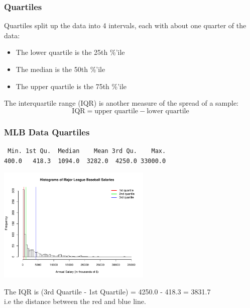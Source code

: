 \documentclass[handout]{beamer}
\newcommand{\blue}[1]{\textcolor{blue2}{#1}}
\begin{document}
\begin{frame}
\frametitle{Quartiles}
\blue{Quartiles} split up the data into 4 intervals, each with about one quarter of the data:

\vspace{0.25cm}

\begin{itemize}
\pause \item The lower quartile is the 25th \%'ile
\pause \item The median is the 50th \%'ile
\pause \item The upper quartile is the 75th \%'ile
\end{itemize}

\vspace{0.25cm}

\pause The \blue{interquartile range (IQR)} is another measure of the spread of a sample:
\[
\mbox{IQR} = \mbox{upper quartile} - \mbox{lower quartile}
\]

\end{frame}


\begin{frame}[fragile]
\frametitle{MLB Data Quartiles}

\begin{verbatim}
 Min. 1st Qu.  Median    Mean 3rd Qu.    Max.
400.0   418.3  1094.0  3282.0  4250.0 33000.0
\end{verbatim}

\begin{center}
\includegraphics[height=5.5cm]{figure/MLB_quartiles.pdf}
\end{center}

The IQR is (3rd Quartile - 1st Quartile) = 4250.0 - 418.3 = 3831.7\\
i.e the distance between the red and blue line.  

\end{frame}
\end{document}
